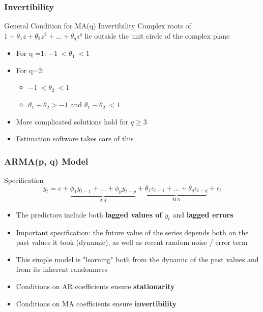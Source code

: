 \documentclass{beamer}
\begin{document}
\begin{frame}
  \frametitle{Invertibility}

  \begin{alertblock}{General Condition for MA(q) Invertibility}
    Complex roots of $1 + \theta_1z + \theta_2 z^2 + \dots + \theta_q z^q$ lie outside the unit circle of the complex plane
  \end{alertblock}

  \smallskip

  \begin{itemize}
  \item For q =1: $-1 \ < \theta_1 \ <1$
  \item For q=2:
    \begin{itemize}
    \item $-1 \ < \theta_2 \ <1$
    \item $\theta_1 + \theta_2 > -1$ and $\theta_1 - \theta_2 \ < 1$
    \end{itemize}
  \item More complicated solutions hold for $q \geq 3$
  \item Estimation software takes care of this
  \end{itemize}
  
\end{frame}


\begin{frame}
  \frametitle{ARMA(p, q) Model}
  \begin{block}{Specification}
    \begin{equation*}
      y_t = c + \underbrace{\phi_1 y_{t-1} + \dots + \phi_p y_{t-p}}_{\text{AR}} + \underbrace{\theta_1 \epsilon_{t-1} + \dots + \theta_q \epsilon_{t-q}}_{\text{MA}} + \epsilon_t
    \end{equation*}
  \end{block}

  \medskip

  \begin{itemize}
  \item The predictors include both \textbf{lagged values of $y_t$} and \textbf{lagged errors}
  \item Important specification: the future value of the series depends both on the past values it took (dynamic), as well as recent random noise / error term 
  \item This simple model is "learning" both from the dynamic of the past values and from its inherent randomness
  \item Conditions on AR coefficients ensure \textbf{stationarity}
  \item Conditions on MA coefficients ensure \textbf{invertibility}
  \end{itemize}
  
\end{frame}
\end{document}
